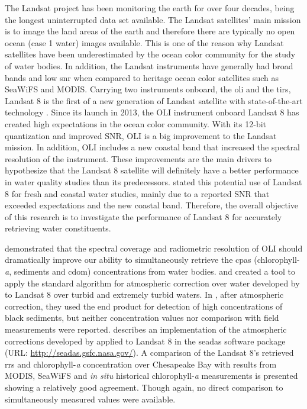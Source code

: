 The Landsat project has been monitoring the earth for over four decades, being the longest uninterrupted data set available. The Landsat satellites' main mission is to image the land areas of the earth and therefore there are typically no open ocean (case 1 water) images available. This is one of the reason why Landsat satellites have been underestimated by the ocean color community for the study of water bodies. In addition, the Landsat instruments have generally had broad bands and low \acrfull{snr} when compared to heritage ocean color satellites such as SeaWiFS and MODIS. Carrying two instruments onboard, the \acrfull{oli} and the \acrfull{tirs}, Landsat 8 is the first of a new generation of Landsat satellite with state-of-the-art technology \cite{Irons:2012}. Since its launch in 2013, the OLI instrument onboard Landsat 8 has created high expectations in the ocean color community. With its 12-bit quantization and improved SNR, OLI is a big improvement to the Landsat mission. In addition, OLI includes a new coastal band that increased the spectral resolution of the instrument. These improvements are the main drivers to hypothesize that the Landsat 8 satellite will definitely have a better performance in water quality studies than its predecessors. \cite{Roy:2014} stated this potential use of Landsat 8 for fresh and coastal water studies, mainly due to a reported SNR that exceeded expectations and the new coastal band. Therefore, the overall objective of this research is to investigate the performance of Landsat 8 for accurately retrieving water constituents.

\cite{Gerace:2013} demonstrated that the spectral coverage and radiometric resolution of OLI should dramatically improve our ability to simultaneously retrieve the \acrfull{cpas} (chlorophyll-{\it a}, sediments and \acrfull{cdom}) concentrations from water bodies. \cite{Vanhellemont2014} and \cite{Vanhellemont:2015} created a tool to apply the standard algorithm for atmospheric correction over water developed by \cite{Gordon:1994} to Landsat 8 over turbid and extremely turbid waters. In \cite{Vanhellemont:2015}, after atmospheric correction, they used the end product for detection of high concentrations of black sediments, but neither concentration values nor comparison with field measurements were reported. \cite{Franz:2015} describes an implementation of the atmospheric corrections developed by \cite{Gordon:1994} applied to Landsat 8 in the \acrfull{seadas} software package (URL: \url{http://seadas.gsfc.nasa.gov/}). A comparison of the Landsat 8's retrieved \acrfull{rrs} and chlorophyll-{\it a} concentration over Chesapeake Bay with results from MODIS, SeaWiFS and {\it in situ} historical chlorophyll-{\it a} measurements is presented showing a relatively good agreement. Though again, no direct comparison to simultaneously measured values were available.


